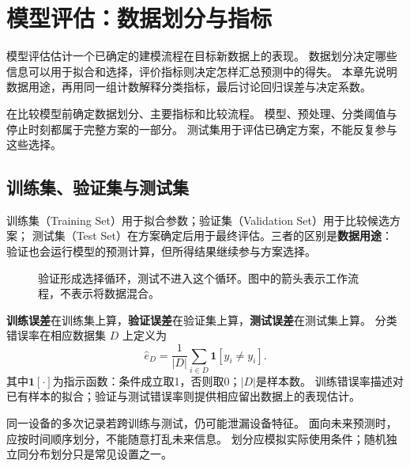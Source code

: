 \chapter{模型评估：数据划分与指标}
\label{ch:evaluation}

模型评估估计一个已确定的建模流程在目标新数据上的表现。
数据划分决定哪些信息可以用于拟合和选择，评价指标则决定怎样汇总预测中的得失。
本章先说明数据用途，再用同一组计数解释分类指标，最后讨论回归误差与决定系数。

\begin{keyidea}
在比较模型前确定数据划分、主要指标和比较流程。
模型、预处理、分类阈值与停止时刻都属于完整方案的一部分。
测试集用于评估已确定方案，不能反复参与这些选择。
\end{keyidea}

\section{训练集、验证集与测试集}
\label{sec:eval-split}

训练集（Training Set）用于拟合参数；验证集（Validation Set）用于比较候选方案；
测试集（Test Set）在方案确定后用于最终评估。三者的区别是\textbf{数据用途}：
验证也会运行模型的预测计算，但所得结果继续参与方案选择。

\begin{figure}[htbp]
\centering
\caption{验证形成选择循环，测试不进入这个循环。图中的箭头表示工作流程，不表示将数据混合。}
\label{fig:eval-split}
\par\smallskip
{}
\end{figure}

\textbf{训练误差}在训练集上算，\textbf{验证误差}在验证集上算，\textbf{测试误差}在测试集上算。
分类错误率在相应数据集 $D$ 上定义为
\[
 \widehat e_D=\frac1{|D|}\sum_{i\in D}\mathbf1[\hat y_i\ne y_i].
\]
其中$\mathbf1[\cdot]$为指示函数：条件成立取1，否则取0；$|D|$是样本数。
训练错误率描述对已有样本的拟合；验证与测试错误率则提供相应留出数据上的表现估计。

\begin{pitfall}[按预测对象和时间划分]
同一设备的多次记录若跨训练与测试，仍可能泄漏设备特征。
面向未来预测时，应按时间顺序划分，不能随意打乱未来信息。
划分应模拟实际使用条件；随机独立同分布划分只是常见设置之一。
\end{pitfall}

